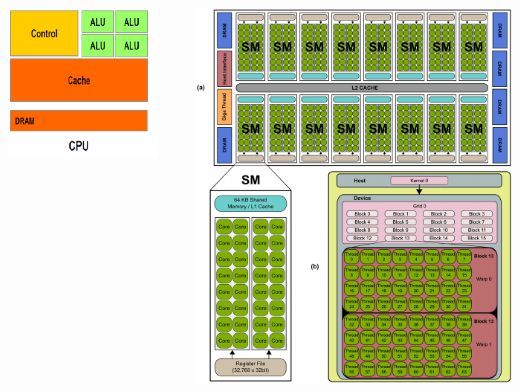 \documentclass[pdf,
serif,
compress,
xcolor=table,
dvipsnames,
spanish,
aspectratio=169]{beamer}
\begin{document}
{\begin{columns}
\begin{column}{0.19\textwidth}
\begin{center}
\includegraphics[width=0.9\textwidth]{FigsOpenGL/CPU}\\
\end{center}
\end{column}
\begin{column}{0.30\textwidth}  
    \begin{center}
     \includegraphics[width=\textwidth]{FigsOpenGL/Typical-NVIDIA-GPU-architecture}
     \end{center}
\end{column}
\end{columns}
}
\end{document}
